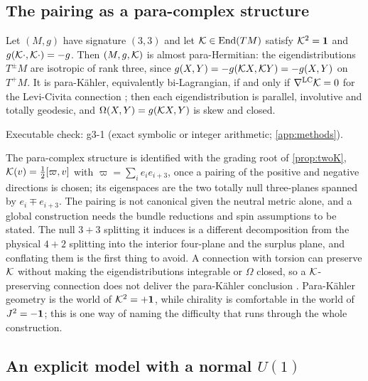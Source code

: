 \subsection{The pairing as a para-complex structure}

\begin{proposition}
\label{prop:parahermitian}
Let $(M,g)$ have signature $(3,3)$ and let $\mathcal K\in\operatorname{End}(TM)$ satisfy $\mathcal K^2=\mathbf 1$ and $g(\mathcal K\cdot,\mathcal K\cdot)=-g$. Then $(M,g,\mathcal K)$ is almost
para-Hermitian: the eigendistributions $T^\pm M$ are isotropic of rank three, since $g(X,Y)=-g(\mathcal K X,\mathcal K Y)=-g(X,Y)$ on $T^+M$. It is
para-K\"ahler, equivalently bi-Lagrangian, if and only if $\nabla^{\rm LC}\mathcal K=0$ for the Levi-Civita connection \cite{CruceanuFortunyGadea96,EtayoSantamaria06};
then each eigendistribution is parallel, involutive and totally geodesic, and $\Omega(X,Y)=g(\mathcal K X,Y)$ is skew and closed.
\end{proposition}

\noindent Executable check: g3-1 (exact symbolic or integer arithmetic; \cref{app:methods}).

The para-complex structure is identified with the grading root of \cref{prop:twoK}, $\mathcal K(v)=\tfrac12[\varpi,v]$ with $\varpi=\sum_ie_ie_{i+3}$, once a pairing of the
positive and negative directions is chosen; its eigenspaces are the two totally null three-planes spanned by $e_i\mp e_{i+3}$. The pairing is not canonical
given the neutral metric alone, and a global construction needs the bundle reductions and spin assumptions to be stated. The null $3{+}3$ splitting it induces is a different
decomposition from the physical $4{+}2$ splitting into the interior four-plane and the surplus plane, and conflating them is the first thing to avoid. A
connection with torsion can preserve $\mathcal K$ without making the eigendistributions integrable or $\Omega$ closed, so a $\mathcal K$-preserving connection does not
deliver the para-K\"ahler conclusion \cite{MarottaSzabo21,LoustauSanders22}. Para-K\"ahler geometry is the world of $\mathcal K^2=+\mathbf 1$, while chirality is
comfortable in the world of $J^2=-\mathbf 1$; this is one way of naming the difficulty that runs through the whole construction.

\subsection{An explicit model with a normal $U(1)$}
\label{sec:curvedmodel}

